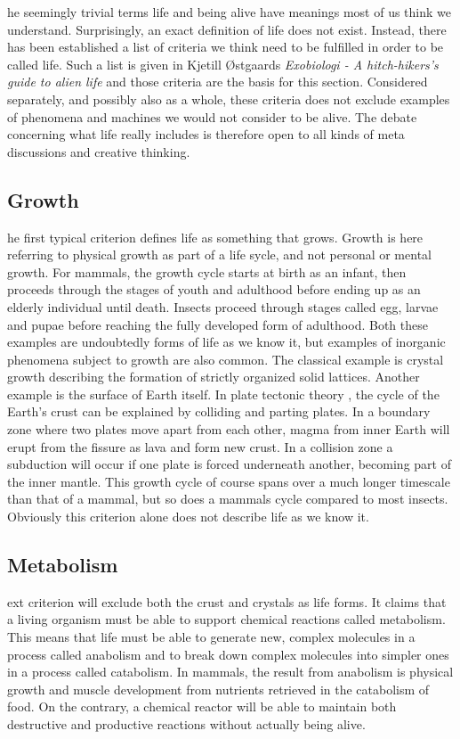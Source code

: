 \noindent
{}he seemingly trivial terms life and being alive have meanings most of us think we understand.
Surprisingly, an exact definition of life does not exist.
Instead, there has been established a list of criteria we think need to be fulfilled in order to be called life.
Such a list is given in Kjetill Østgaards \textit{Exobiologi - A hitch-hikers's guide to alien life} \cite{Exoboken} and those criteria are the basis for this section.
Considered separately, and possibly also as a whole, these criteria does not exclude examples of phenomena and machines we would not consider to be alive.
The debate concerning what life really includes is therefore open to all kinds of meta discussions and creative thinking.

\subsection{Growth}
he first typical criterion defines life as something that grows.
Growth is here referring to physical growth as part of a life sycle, and not personal or mental growth.
For mammals, the growth cycle starts at birth as an infant, then proceeds through the stages of youth and adulthood before ending up as an elderly individual until death.
Insects proceed through stages called egg, larvae and pupae before reaching the fully developed form of adulthood.
Both these examples are undoubtedly forms of life as we know it, but examples of inorganic phenomena subject to growth are also common.
The classical example is crystal growth describing the formation of strictly organized solid lattices.
Another example is the surface of Earth itself.
In plate tectonic theory \cite{tectonic}, the cycle of the Earth's crust can be explained by colliding and parting plates.
In a boundary zone where two plates move apart from each other, magma from inner Earth will erupt from the fissure as lava and form new crust.
In a collision zone a subduction will occur if one plate is forced underneath another, becoming part of the inner mantle.
This growth cycle of course spans over a much longer timescale than that of a mammal, but so does a mammals cycle compared to most insects.
Obviously this criterion alone does not describe life as we know it.

\subsection{Metabolism}
ext criterion will exclude both the crust and crystals as life forms.
It claims that a living organism must be able to support chemical reactions called metabolism.
This means that life must be able to generate new, complex molecules in a process called anabolism and to break down complex molecules into simpler ones in a process called catabolism.
In mammals, the result from anabolism is physical growth and muscle development from nutrients retrieved in the catabolism of food.
On the contrary, a chemical reactor will be able to maintain both destructive and productive reactions without actually being alive.

